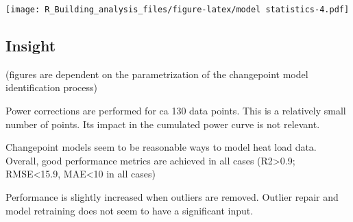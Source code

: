 \documentclass[
]{article}
\begin{document}
\texttt{[image: R\_Building\_analysis\_files/figure-latex/model statistics-4.pdf]}

\hypertarget{insight-4}{%
\subsection{Insight}\label{insight-4}}

(figures are dependent on the parametrization of the changepoint model
identification process)

Power corrections are performed for ca 130 data points. This is a
relatively small number of points. Its impact in the cumulated power
curve is not relevant.

Changepoint models seem to be reasonable ways to model heat load data.
Overall, good performance metrics are achieved in all cases
(R2\textgreater0.9; RMSE\textless15.9, MAE\textless10 in all cases)

Performance is slightly increased when outliers are removed. Outlier
repair and model retraining does not seem to have a significant input.
\end{document}
